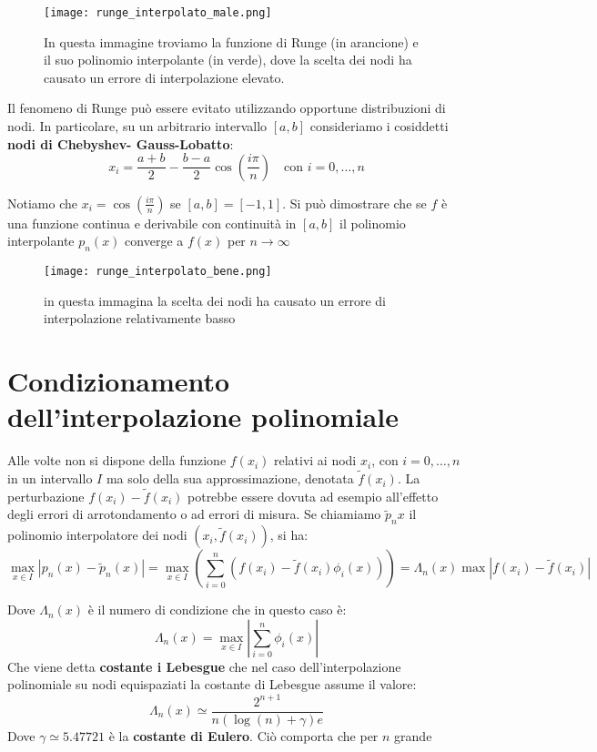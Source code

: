 \begin{figure}[h!]
    \centering
    \texttt{[image: runge\_interpolato\_male.png]}
    \caption{In questa immagine troviamo la funzione di Runge (in arancione) e il suo polinomio interpolante (in verde), dove la scelta dei nodi ha causato un errore di interpolazione elevato.}
    \label{fig:runge_interpolazione}
\end{figure}

Il fenomeno di Runge può essere evitato utilizzando opportune distribuzioni di nodi. In
particolare, su un arbitrario intervallo $[a, b]$ consideriamo i cosiddetti \textbf{nodi di Chebyshev-
Gauss-Lobatto}:
\[
    x_i = \frac{a+b}{2} - \frac{b-a}{2} \cos{(\frac{i\pi}{n})} \quad \text{con }i= 0 ,\dots, n   
\]

Notiamo che $x_i = \cos{(\frac{i\pi}{n})}$ se $[a,b] = [-1,1]$. Si può dimostrare che se $f$ è una funzione continua e derivabile con continuità in $[a,b]$ il polinomio interpolante $p_n(x)$ converge a $f(x)$ per $n\to\infty$

\begin{figure}[h!]
    \centering
    \texttt{[image: runge\_interpolato\_bene.png]}
    \caption{in questa immagina la scelta dei nodi ha causato un errore di interpolazione relativamente basso}
    \label{fig:runge_interpolazione_bella}
\end{figure}

\section{Condizionamento dell’interpolazione polinomiale}

Alle volte non si dispone della funzione $f(x_i)$ relativi ai nodi $x_i$, con $i=0,\dots, n$ in un intervallo $I$ ma solo della sua approssimazione, denotata $\tilde{f}(x_i)$. La  perturbazione $f(x_i) - \tilde{f}(x_i)$ potrebbe essere dovuta ad esempio all'effetto degli errori di arrotondamento o ad errori di misura. Se chiamiamo $\tilde{p}_n{x}$ il polinomio interpolatore dei nodi $(x_i, \tilde{f}(x_i))$, si ha:
\[
    \max_{x\in I} |p_n(x) - \tilde{p}_n(x)| = \max_{x\in I}(\sum^n_{i=0}(f(x_i)-\tilde{f}(x_i)\phi_i(x))) =  \Lambda_n (x) \max |f(x_i) - \tilde{f}(x_i)|
\]

Dove $\Lambda_n (x)$ è il numero di condizione che in questo caso è:
\[
    \Lambda_n (x) = \max_{x\in I} |\sum_{i=0}^{n}\phi_i(x)|
\]
Che viene detta \textbf{costante i Lebesgue} che nel caso dell’interpolazione polinomiale su nodi equispaziati la costante di Lebesgue assume il valore:
\[
    \Lambda_n(x) \simeq \frac{2^{n+1}}{n(\log(n) + \gamma) e}    
\]
Dove $\gamma \simeq 5.47721$ è la \textbf{costante di Eulero}. Ciò comporta che per $n$ grande 